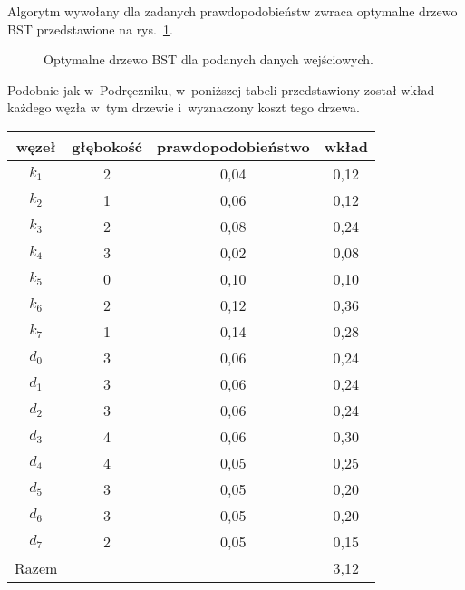 \exercise %
Algorytm  wywołany dla zadanych prawdopodobieństw zwraca optymalne drzewo BST przedstawione na rys.\ \ref{fig:15.5-2}.
\begin{figure}[!ht]
	\centering 
	\caption{Optymalne drzewo BST dla podanych danych wejściowych.} \label{fig:15.5-2}
\end{figure}
Podobnie jak w~Podręczniku, w~poniższej tabeli przedstawiony został wkład każdego węzła w~tym drzewie i~wyznaczony koszt tego drzewa.
\begin{table}[!ht]
	\centering
		\begin{tabular}{cccc}
			węzeł & głębokość & prawdopodobieństwo & wkład \\ \hline
			$k_1$ & 2 & 0{,}04 & 0{,}12 \\
			$k_2$ & 1 & 0{,}06 & 0{,}12 \\
			$k_3$ & 2 & 0{,}08 & 0{,}24 \\
			$k_4$ & 3 & 0{,}02 & 0{,}08 \\
			$k_5$ & 0 & 0{,}10 & 0{,}10 \\
			$k_6$ & 2 & 0{,}12 & 0{,}36 \\
			$k_7$ & 1 & 0{,}14 & 0{,}28 \\
			$d_0$ & 3 & 0{,}06 & 0{,}24 \\
			$d_1$ & 3 & 0{,}06 & 0{,}24 \\
			$d_2$ & 3 & 0{,}06 & 0{,}24 \\
			$d_3$ & 4 & 0{,}06 & 0{,}30 \\
			$d_4$ & 4 & 0{,}05 & 0{,}25 \\
			$d_5$ & 3 & 0{,}05 & 0{,}20 \\
			$d_6$ & 3 & 0{,}05 & 0{,}20 \\
			$d_7$ & 2 & 0{,}05 & 0{,}15 \\ \hline
			Razem & & & 3{,}12
		\end{tabular}
\end{table}

\exercise %
\exercise %
